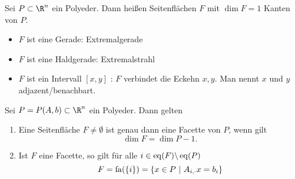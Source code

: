 \begin{definition}
	Sei $P \subset \R^n$ ein Polyeder. Dann heißen Seitenflächen $F$ mit $\dim F = 1$ Kanten von $P$.
	\begin{itemize}
		\item $F$ ist eine Gerade: Extremalgerade
		\item $F$ ist eine Haldgerade: Extremalstrahl
		\item $F$ ist ein Intervall $[x,y]$ : $F$ verbindet die Eckehn $x,y$. Man nennt $x$ und $y$ adjazent/benachbart.
	\end{itemize}
\end{definition}
\begin{korollar}
	Sei $P = P(A,b) \subset \R^n$ ein Polyeder. Dann gelten
	\begin{enumerate}[label = (\alph*)]
		\item Eine Seitenfläche $F \neq \emptyset$ ist genau dann eine Facette von $P$, wenn gilt
			\begin{equation*}
				\dim F = \dim P-1.
			\end{equation*}
		\item Ist $F$ eine Facette, so gilt für alle $i \in \operatorname{eq}(F)\backslash \operatorname{eq}(P)$
			 \begin{equation*}
				 F = \operatorname{fa}(\left\{i \right\}) = \left\{ x \in P\ |\ A_{i,\cdot}x = b_{i} \right\}
			\end{equation*}
	\end{enumerate}
\end{korollar}
